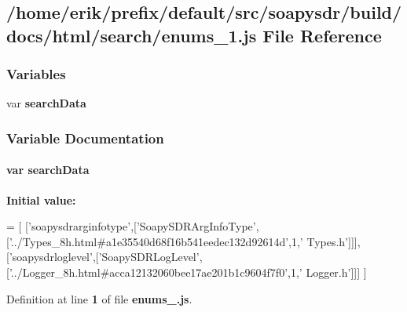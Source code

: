 \subsection{/home/erik/prefix/default/src/soapysdr/build/docs/html/search/enums\+\_\+1.js File Reference}
\label{enums__1_8js}
\subsubsection*{Variables}
\begin{DoxyCompactItemize}
\item 
var {\bf search\+Data}
\end{DoxyCompactItemize}


\subsubsection{Variable Documentation}
\paragraph[{search\+Data}]{\setlength{\rightskip}{0pt plus 5cm}var search\+Data}\label{enums__1_8js_ad01a7523f103d6242ef9b0451861231e}
{\bfseries Initial value\+:}
\begin{DoxyCode}
=
[
  [\textcolor{stringliteral}{'soapysdrarginfotype'},[\textcolor{stringliteral}{'SoapySDRArgInfoType'},[\textcolor{stringliteral}{'../Types\_8h.html#a1e35540d68f16b541eedec132d92614d'},1,\textcolor{stringliteral}{'
      Types.h'}]]],
  [\textcolor{stringliteral}{'soapysdrloglevel'},[\textcolor{stringliteral}{'SoapySDRLogLevel'},[\textcolor{stringliteral}{'../Logger\_8h.html#acca12132060bee17ae201b1c9604f7f0'},1,\textcolor{stringliteral}{'
      Logger.h'}]]]
]
\end{DoxyCode}


Definition at line {\bf 1} of file {\bf enums\+\_.\+js}.

